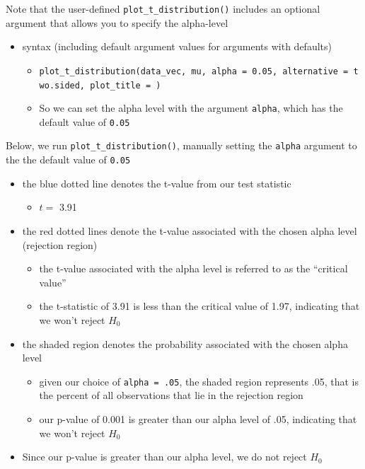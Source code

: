 \documentclass[
  letterpaper,
  DIV=11,
  numbers=noendperiod]{scrartcl}
\providecommand{\tightlist}{%
  \setlength{\itemsep}{0pt}\setlength{\parskip}{0pt}}\usepackage{longtable,booktabs,array}
\begin{document}
Note that the user-defined \texttt{plot\_t\_distribution()} includes an
optional argument that allows you to specify the alpha-level

\begin{itemize}
\tightlist
\item
  syntax (including default argument values for arguments with defaults)

  \begin{itemize}
  \tightlist
  \item
    \texttt{plot\_t\_distribution(data\_vec,\ mu,\ alpha\ =\ 0.05,\ alternative\ =\ \textquotesingle{}two.sided\textquotesingle{},\ plot\_title\ =\ \textquotesingle{}\textquotesingle{})}
  \item
    So we can set the alpha level with the argument \texttt{alpha},
    which has the default value of \texttt{0.05}
  \end{itemize}
\end{itemize}

Below, we run \texttt{plot\_t\_distribution()}, manually setting the
\texttt{alpha} argument to the the default value of \texttt{0.05}

\begin{itemize}
\tightlist
\item
  the blue dotted line denotes the t-value from our test statistic

  \begin{itemize}
  \tightlist
  \item
    \(t =\) 3.91
  \end{itemize}
\item
  the red dotted lines denote the t-value associated with the chosen
  alpha level (rejection region)

  \begin{itemize}
  \tightlist
  \item
    the t-value associated with the alpha level is referred to as the
    ``critical value''
  \item
    the t-statistic of 3.91 is less than the critical value of 1.97,
    indicating that we won't reject \(H_0\)
  \end{itemize}
\item
  the shaded region denotes the probability associated with the chosen
  alpha level

  \begin{itemize}
  \tightlist
  \item
    given our choice of \texttt{alpha\ =\ .05}, the shaded region
    represents .05, that is the percent of all observations that lie in
    the rejection region
  \item
    our p-value of 0.001 is greater than our alpha level of .05,
    indicating that we won't reject \(H_0\)
  \end{itemize}
\item
  Since our p-value is greater than our alpha level, we do not reject
  \(H_0\)
\end{itemize}
\end{document}
